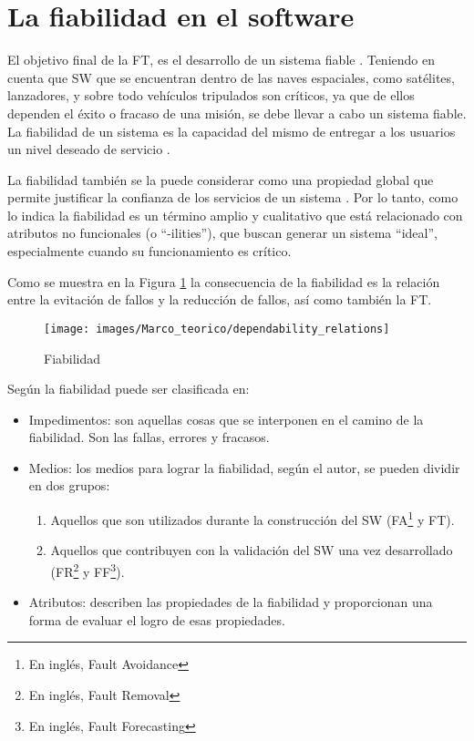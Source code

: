\section{La fiabilidad en el software}
El objetivo final de la \ac{FT}, es el desarrollo de un sistema fiable \citep{FTDesign}. Teniendo
en cuenta que \ac{SW} que se encuentran dentro de las naves espaciales, como satélites,
lanzadores, y sobre todo vehículos tripulados son críticos, ya que de ellos dependen el éxito o
fracaso de una misión, se debe llevar a cabo un sistema fiable. La fiabilidad de un sistema es la
capacidad del mismo de entregar a los usuarios un nivel deseado de servicio \citep{FTDesign}.

La fiabilidad también se la puede considerar como una propiedad global que permite justificar la
confianza de los servicios de un sistema \citep{FTAvionics}. Por lo tanto, como lo indica
\cite{FTAvionics} la fiabilidad es un término amplio y cualitativo que está relacionado con
atributos no funcionales (o ``-ilities''), que buscan generar un sistema ``ideal'', especialmente
cuando su funcionamiento es crítico.

Como se muestra en la Figura \ref{fig:dependability_relations} la consecuencia de la fiabilidad es
la relación entre la evitación de fallos y la reducción de fallos, así como también la \ac{FT}.

\begin{figure}[h]
 \centering
 \texttt{[image: images/Marco\_teorico/dependability\_relations]}
  \caption{Fiabilidad \protect\citep{FTAvionics}}
\label{fig:dependability_relations}
\end{figure}

Según \cite{Pullum01} la fiabilidad puede ser clasificada en:
\begin{itemize}
 \item Impedimentos: son aquellas cosas que se interponen en el camino de la fiabilidad. Son las
fallas, errores y fracasos.
 \item Medios: los medios para lograr la fiabilidad, según el autor, se pueden dividir en dos
grupos:
  \begin{enumerate}
    \item Aquellos que son utilizados durante la construcción del \ac{SW} (\ac{FA}\footnote{En
    inglés, Fault Avoidance} y \ac{FT}).
    \item Aquellos que contribuyen con la validación del \ac{SW} una vez desarrollado
    (\ac{FR}\footnote{En inglés, Fault Removal} y \ac{FF}\footnote{En inglés, Fault Forecasting}).
  \end{enumerate}

 \item Atributos: describen las propiedades de la fiabilidad y proporcionan una forma de evaluar el
logro de esas propiedades.
\end{itemize}

